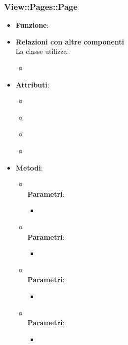 \subsubsection{View::Pages::Page}
\begin{itemize}
\item\textbf{Funzione}:
\item\textbf{Relazioni con altre componenti}\\
La classe utilizza:
	\begin{itemize}
		\item
	\end{itemize}
\item\textbf{Attributi}:
	\begin{itemize}
		\item\code{}\\
		\item\code{}\\
		\item\code{}\\
		\item\code{}\\
	\end{itemize}
\item\textbf{Metodi}:
	\begin{itemize}
		\item\code{}\\
		\textbf{Parametri}:
			\begin{itemize}
				\item\code{}\\
			\end{itemize}
		\item\code{}\\
		\textbf{Parametri}:
			\begin{itemize}
				\item\code{}\\
			\end{itemize}
		\item\code{}\\
		\textbf{Parametri}:
			\begin{itemize}
				\item\code{}\\
			\end{itemize}
		\item\code{}\\
		\textbf{Parametri}:
			\begin{itemize}
				\item\code{}\\
			\end{itemize}
	\end{itemize}
\end{itemize}

